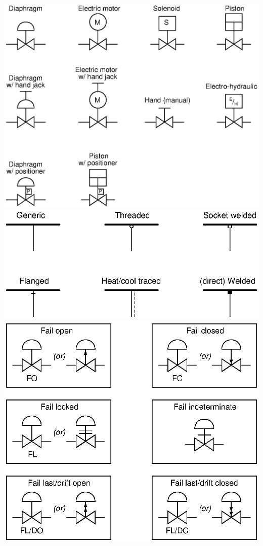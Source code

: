 \documentclass[10pt,a5paper]{article}
\begin{document}
\includegraphics[width=1\textwidth]{diagrams03.eps}
\includegraphics[width=1\textwidth]{diagrams04.eps}
\includegraphics[width=1\textwidth]{diagrams05.eps}
\end{document}
